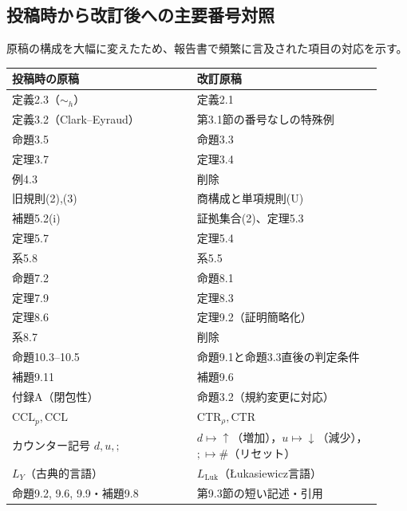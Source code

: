 \documentclass[10pt,a4paper]{ltjsarticle}
\begin{document}
\subsection*{投稿時から改訂後への主要番号対照}
原稿の構成を大幅に変えたため、報告書で頻繁に言及された項目の対応を示す。
\begin{center}\small
\begin{tabular}{@{}p{0.46\linewidth}p{0.46\linewidth}@{}}
\toprule
投稿時の原稿 & 改訂原稿\\\midrule
定義2.3（$\sim_h$）& 定義2.1\\
定義3.2（Clark--Eyraud）& 第3.1節の番号なしの特殊例\\
命題3.5 & 命題3.3\\
定理3.7 & 定理3.4\\
例4.3 & 削除\\
旧規則(2),(3) & 商構成と単項規則(U)\\
補題5.2(i) & 証拠集合(2)、定理5.3\\
定理5.7 & 定理5.4\\
系5.8 & 系5.5\\
命題7.2 & 命題8.1\\
定理7.9 & 定理8.3\\
定理8.6 & 定理9.2（証明簡略化）\\
系8.7 & 削除\\
命題10.3--10.5 & 命題9.1と命題3.3直後の判定条件\\
補題9.11 & 補題9.6\\
付録A（閉包性）& 命題3.2（規約変更に対応）\\
$\mathrm{CCL}_{p},\mathrm{CCL}$ & $\mathrm{CTR}_{\rho},\mathrm{CTR}$\\
カウンター記号 $d,u,;$ & $d\mapsto\uparrow$（増加），$u\mapsto\downarrow$（減少），$;\mapsto\#$（リセット）\\
$L_Y$（古典的言語）& $L_{\mathrm{Luk}}$（Łukasiewicz言語）\\
命題9.2, 9.6, 9.9・補題9.8 & 第9.3節の短い記述・引用\\
\bottomrule
\end{tabular}
\end{center}



\end{document}
